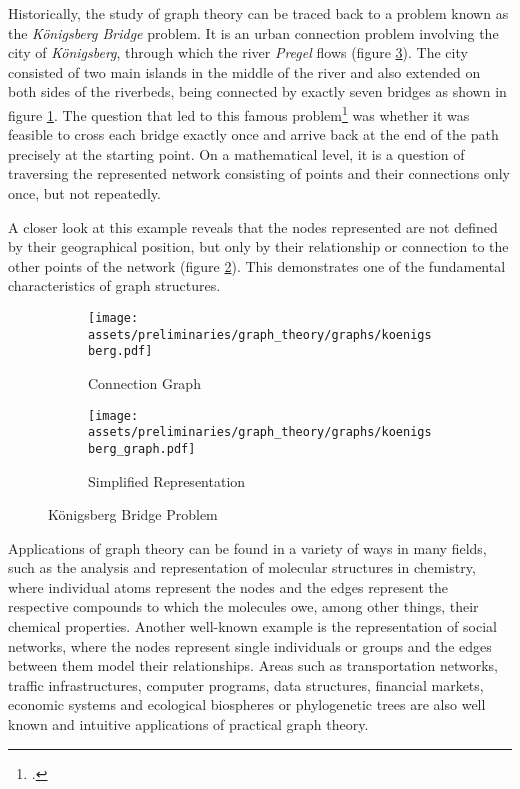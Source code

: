 \documentclass[a4paper, 12pt]{report}
\begin{document}
Historically, the study of graph theory can be traced back to a problem known as the \textit{Königsberg Bridge} problem. It is an urban connection problem involving the city of \textit{Königsberg}, through which the river \textit{Pregel} flows (figure \ref{fig:königsberg-bridge-problem}). The city consisted of two main islands in the middle of the river and also extended on both sides of the riverbeds, being connected by exactly seven bridges as shown in figure \ref{fig:connection-graph}. The question that led to this famous problem\footcite{kantor2005tale} was whether it was feasible to cross each bridge exactly once and arrive back at the end of the path precisely at the starting point. On a mathematical level, it is a question of traversing the represented network consisting of points and their connections only once, but not repeatedly.

A closer look at this example reveals that the nodes represented are not defined by their geographical position, but only by their relationship or connection to the other points of the network (figure \ref{fig:simplified-representation}). This demonstrates one of the fundamental characteristics of graph structures.

\begin{figure}
\centering
\begin{subfigure}{.62\textwidth}
\centering
\texttt{[image: assets/preliminaries/graph\_theory/graphs/koenigsberg.pdf]}
\caption{Connection Graph}
\label{fig:connection-graph}
\end{subfigure}%
\begin{subfigure}{.38\textwidth}
\centering
\texttt{[image: assets/preliminaries/graph\_theory/graphs/koenigsberg\_graph.pdf]}
\caption{Simplified Representation}
\label{fig:simplified-representation}
\end{subfigure}
\caption{Königsberg Bridge Problem}
\label{fig:königsberg-bridge-problem}
\end{figure}

Applications of graph theory can be found in a variety of ways in many fields, such as the analysis and representation of molecular structures in chemistry, where individual atoms represent the nodes and the edges represent the respective compounds to which the molecules owe, among other things, their chemical properties. Another well-known example is the representation of social networks, where the nodes represent single individuals or groups and the edges between them model their relationships. Areas such as transportation networks, traffic infrastructures, computer programs, data structures, financial markets, economic systems and ecological biospheres or phylogenetic trees are also well known and intuitive applications of practical graph theory.
\end{document}
